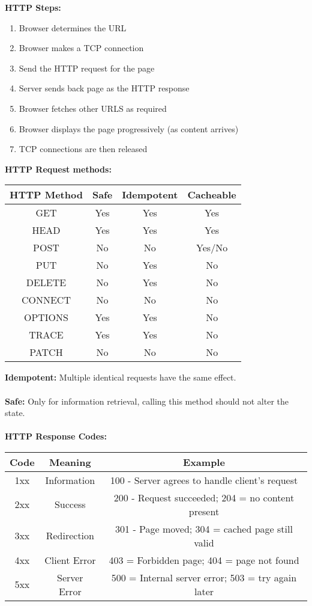 \documentclass[a4paper,10pt]{article}
\begin{document}
\textcolor{JungleGreen}{\textbf{HTTP Steps:}}
\begin{enumerate}
	\item Browser determines the URL 
	\item Browser makes a TCP connection 
	\item Send the HTTP request for the page 
	\item Server sends back page as the HTTP response 
	\item Browser fetches other URLS as required 
	\item Browser displays the page progressively (as content arrives)
	\item TCP connections are then released
\end{enumerate}
\newpage
\textcolor{JungleGreen}{\textbf{HTTP Request methods:}}
\begin{center}
\begin{tabular}{ |c|c|c|c| }
	\hline
	HTTP Method &Safe &Idempotent &Cacheable \\
	\hline
	\hline
	GET &Yes &Yes &Yes \\ 
	\hline
	HEAD &Yes &Yes &Yes \\
	\hline
	POST &No &No &Yes/No \\
	\hline
	PUT &No &Yes &No \\
	\hline
	DELETE &No &Yes &No \\
	\hline
	CONNECT &No &No &No \\
	\hline
	OPTIONS &Yes &Yes &No \\ 
	\hline
	TRACE &Yes &Yes &No \\
	\hline
	PATCH &No &No &No \\
	\hline
\end{tabular}
\end{center}
\textcolor{JungleGreen}{\textbf{Idempotent:}} Multiple identical requests have the same effect. \\\\
\textcolor{JungleGreen}{\textbf{Safe:}} Only for information retrieval, calling this method should not alter the state. \\\\
\textcolor{JungleGreen}{\textbf{HTTP Response Codes:}}
\begin{center}
	\begin{tabular}{ |c|c|c| }
		\hline
		Code &Meaning &Example \\
		\hline
		\hline
		1xx &Information &100 - Server agrees to handle client's request \\
		\hline
		2xx &Success &200 - Request succeeded; 204 = no content present \\
		\hline
		3xx &Redirection &301 - Page moved; 304 = cached page still valid \\
		\hline
		4xx &Client Error &403 = Forbidden page; 404 = page not found \\
		\hline
		5xx &Server Error &500 = Internal server error; 503 = try again later \\
		\hline
	\end{tabular}
\end{center}
\end{document}
